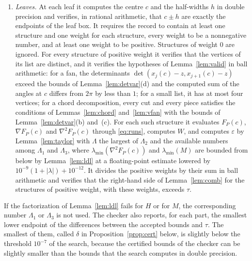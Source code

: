 \documentclass[11pt]{amsart}
\theoremstyle{definition}
\theoremstyle{remark}
\numberwithin{equation}{section}
\newcommand{\lmin}{\lambda_{\min}}
\begin{document}
\begin{enumerate}[label=(\arabic*),leftmargin=*]
\item\label{st:leaf} \emph{Leaves.} At each leaf it computes the centre $c$ and the half-widths $h$ in double precision and verifies, in rational arithmetic, that $c\pm h$ are exactly the endpoints of the leaf box. It requires the record to contain at least one structure and one weight for each structure, every weight to be a nonnegative number, and at least one weight to be positive. Structures of weight $0$ are ignored. For every structure of positive weight it verifies that the vertices of its list are distinct, and it verifies the hypotheses of Lemma~\ref{lem:valid} in ball arithmetic: for a fan, the determinants $\det(x_j(c)-z,x_{j+1}(c)-z)$ exceed the bounds of Lemma~\ref{lem:detvar}(d) and the computed sum of the angles at $c$ differs from $2\pi$ by less than $1$; for a small list, it has at most four vertices; for a chord decomposition, every cut and every piece satisfies the conditions of Lemmas~\ref{lem:chord} and~\ref{lem:vfan} with the bounds of Lemma~\ref{lem:detvar}(b) and~(c). For each such structure it evaluates $F_P(c)$, $\nabla F_P(c)$ and $\nabla^2F_P(c)$ through \eqref{eq:runs}, computes $W$, and computes $\varepsilon$ by Lemma~\ref{lem:taylor} with $\Lambda$ the largest of $\Lambda_2$ and the available numbers among $\Lambda_1$ and $\Lambda_3$, where $\lmin(\nabla^2F_P(c))$ and $\lmin(M)$ are bounded from below by Lemma~\ref{lem:ldl} at a floating-point estimate lowered by $10^{-9}(1+|\lambda|)+10^{-12}$. It divides the positive weights by their sum in ball arithmetic and verifies that the right-hand side of Lemma~\ref{lem:comb} for the structures of positive weight, with these weights, exceeds $\tau$.
\end{enumerate}
If the factorization of Lemma~\ref{lem:ldl} fails for $H$ or for $M$, the corresponding number $\Lambda_1$ or $\Lambda_3$ is not used. The checker also reports, for each part, the smallest lower endpoint of the differences between the accepted bounds and $\tau$. The smallest of them, called $\delta$ in Proposition~\ref{prop:cert} below, is slightly below the threshold $10^{-7}$ of the search, because the certified bounds of the checker can be slightly smaller than the bounds that the search computes in double precision.
\end{document}
